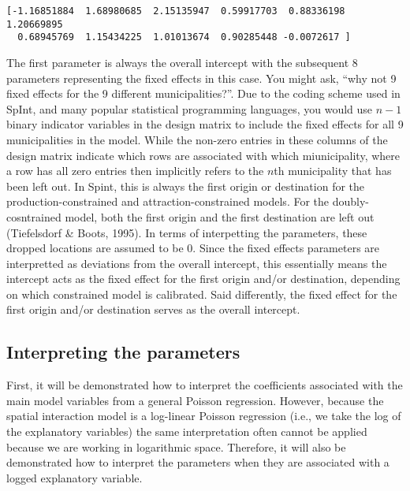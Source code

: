 \documentclass[11pt]{article}
\begin{document}
    \begin{Verbatim}[commandchars=\\\{\}]
[-1.16851884  1.68980685  2.15135947  0.59917703  0.88336198  1.20669895
  0.68945769  1.15434225  1.01013674  0.90285448 -0.0072617 ]

    \end{Verbatim}

    The first parameter is always the overall intercept with the subsequent
8 parameters representing the fixed effects in this case. You might ask,
``why not 9 fixed effects for the 9 different municipalities?''. Due to
the coding scheme used in SpInt, and many popular statistical
programming languages, you would use \(n - 1\) binary indicator
variables in the design matrix to include the fixed effects for all 9
municipalities in the model. While the non-zero entries in these columns
of the design matrix indicate which rows are associated with which
miunicipality, where a row has all zero entries then implicitly refers
to the \(n\)th municipality that has been left out. In Spint, this is
always the first origin or destination for the production-constrained
and attraction-constrained models. For the doubly-cosntrained model,
both the first origin and the first destination are left out
(Tiefelsdorf \& Boots, 1995). In terms of interpetting the parameters,
these dropped locations are assumed to be 0. Since the fixed effects
parameters are interpretted as deviations from the overall intercept,
this essentially means the intercept acts as the fixed effect for the
first origin and/or destination, depending on which constrained model is
calibrated. Said differently, the fixed effect for the first origin
and/or destination serves as the overall intercept.

    \subsection{Interpreting the
parameters}\label{interpretting-the-parameters}

    First, it will be demonstrated how to interpret the coefficients
associated with the main model variables from a general Poisson
regression. However, because the spatial interaction model is a
log-linear Poisson regression (i.e., we take the log of the explanatory
variables) the same interpretation often cannot be applied because we are
working in logarithmic space. Therefore, it will also be demonstrated
how to interpret the parameters when they are associated with a logged
explanatory variable.
\end{document}
